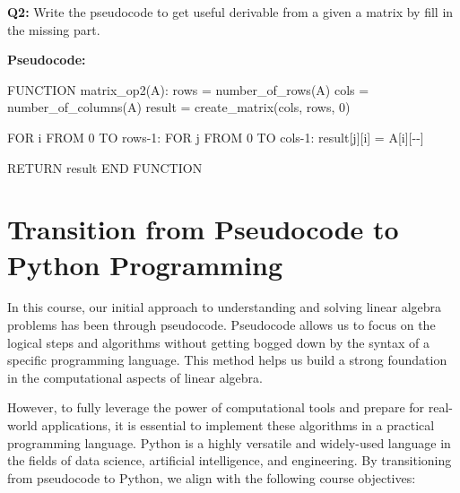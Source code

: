 \documentclass[
  letterpaper,
  DIV=11,
  numbers=noendperiod]{scrreprt}
\newenvironment{Shaded}{\begin{snugshade}}{\end{snugshade}}
\newcommand{\DecValTok}[1]{\textcolor[rgb]{0.68,0.00,0.00}{#1}}
\newcommand{\NormalTok}[1]{\textcolor[rgb]{0.00,0.23,0.31}{#1}}
\newcommand{\OperatorTok}[1]{\textcolor[rgb]{0.37,0.37,0.37}{#1}}
\theoremstyle{plain}
\theoremstyle{definition}
\theoremstyle{remark}
\begin{document}
\textbf{Q2:} Write the pseudocode to get useful derivable from a given a
matrix by fill in the missing part.

\textbf{Pseudocode:}

\begin{Shaded}
\begin{Highlighting}[]
\NormalTok{FUNCTION matrix\_op2(A):}
\NormalTok{    rows }\OperatorTok{=}\NormalTok{ number\_of\_rows(A)}
\NormalTok{    cols }\OperatorTok{=}\NormalTok{ number\_of\_columns(A)}
\NormalTok{    result }\OperatorTok{=}\NormalTok{ create\_matrix(cols, rows, }\DecValTok{0}\NormalTok{)}
    
\NormalTok{    FOR i FROM }\DecValTok{0}\NormalTok{ TO rows}\OperatorTok{{-}}\DecValTok{1}\NormalTok{:}
\NormalTok{        FOR j FROM }\DecValTok{0}\NormalTok{ TO cols}\OperatorTok{{-}}\DecValTok{1}\NormalTok{:}
\NormalTok{            result[j][i] }\OperatorTok{=}\NormalTok{ A[i][}\OperatorTok{{-}{-}}\NormalTok{]}
    
\NormalTok{    RETURN result}
\NormalTok{END FUNCTION}
\end{Highlighting}
\end{Shaded}

\section{Transition from Pseudocode to Python
Programming}\label{transition-from-pseudocode-to-python-programming}

In this course, our initial approach to understanding and solving linear
algebra problems has been through pseudocode. Pseudocode allows us to
focus on the logical steps and algorithms without getting bogged down by
the syntax of a specific programming language. This method helps us
build a strong foundation in the computational aspects of linear
algebra.

However, to fully leverage the power of computational tools and prepare
for real-world applications, it is essential to implement these
algorithms in a practical programming language. Python is a highly
versatile and widely-used language in the fields of data science,
artificial intelligence, and engineering. By transitioning from
pseudocode to Python, we align with the following course objectives:
\end{document}
